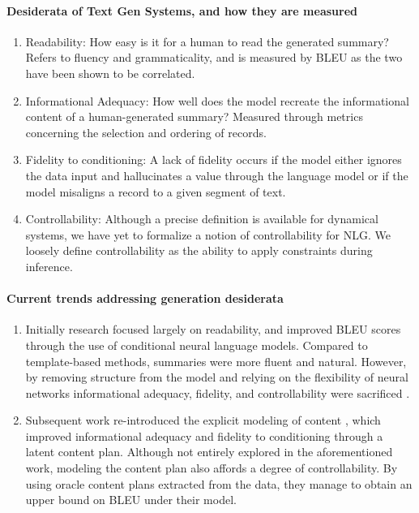 \documentclass[11pt]{article}
\begin{document}
\paragraph{Desiderata of Text Gen Systems, and how they are measured}
\begin{enumerate}
\item Readability: How easy is it for a human to read the generated summary?
Refers to fluency and grammaticality, and is measured by BLEU as the two have been
shown to be correlated.
\item Informational Adequacy: How well does the model recreate the informational content
of a human-generated summary?
Measured through metrics concerning the selection and ordering of records.
\item Fidelity to conditioning: 
A lack of fidelity occurs if the model either ignores the data input and hallucinates
a value through the language model or if the model misaligns a record to a given segment of text.
\item Controllability:
Although a precise definition is available for dynamical systems,
we have yet to formalize a notion of controllability for NLG.
We loosely define controllability as the ability to apply constraints during inference.
\end{enumerate}

\paragraph{Current trends addressing generation desiderata}
\begin{enumerate}
\item Initially research focused largely on readability,
and improved BLEU scores through the use of conditional neural language models.
Compared to template-based methods, summaries were more fluent and natural.
However, by removing structure from the model and relying on the flexibility of neural networks
informational adequacy, fidelity, and controllability were sacrificed \citep{wiseman2017d2t}.
\item Subsequent work re-introduced the explicit modeling of content
\citep{puduppully2018contentselection}, which improved informational adequacy and
fidelity to conditioning through a latent content plan.
Although not entirely explored in the aforementioned work,
modeling the content plan also affords a degree of controllability.
By using oracle content plans extracted from the data,
they manage to obtain an upper bound on BLEU under their model.
\end{enumerate}
\end{document}
